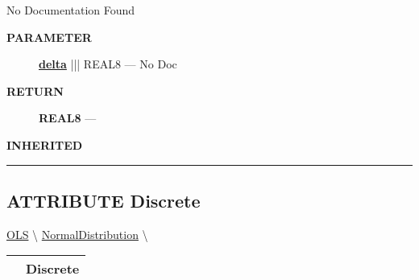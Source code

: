 \par





No Documentation Found






\par
\begin{description}
\item [\colorbox{tagtype}{\color{white} \textbf{\textsf{PARAMETER}}}] \textbf{\underline{delta}} ||| REAL8 --- No Doc
\end{description}







\par
\begin{description}
\item [\colorbox{tagtype}{\color{white} \textbf{\textsf{RETURN}}}] \textbf{REAL8} --- 
\end{description}






\par
\begin{description}
\item [\colorbox{tagtype}{\color{white} \textbf{\textsf{INHERITED}}}] 
\end{description}



\rule{\linewidth}{0.5pt}
\subsection*{\textsf{\colorbox{headtoc}{\color{white} ATTRIBUTE}
Discrete}}

\hypertarget{ecldoc:linearregression.ols.distributionbase.discrete}{}
\hspace{0pt} \hyperlink{ecldoc:linearregression.ols}{OLS} \textbackslash 
\hspace{0pt} \hyperlink{ecldoc:linearregression.ols.normaldistribution}{NormalDistribution} \textbackslash 

{\renewcommand{\arraystretch}{1.5}
\begin{tabularx}{\textwidth}{|>{\raggedright\arraybackslash}l|X|}
\hline
\hspace{0pt}\mytexttt{\color{red} } & \textbf{Discrete} \\
\hline
\end{tabularx}
}

